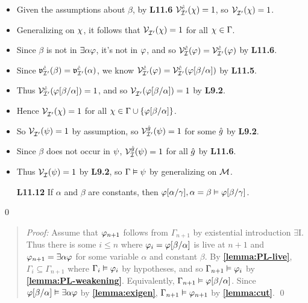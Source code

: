 \documentclass[a4paper, 11pt]{article} %
\begin{document}
\begin{itemize}
    \item Given the assumptions about $\beta$, by \textbf{L11.6} $\mathcal{V}_{\mathcal{I}'}^{\hat{e}}(\chi) = 1$, so $\mathcal{V}_{\mathcal{I}'}^{}(\chi) = 1$.
    \item Generalizing on $\chi$, it follows that $\mathcal{V}_{\mathcal{I}'}^{}(\chi) = 1$ for all $\chi \in \Gamma$.
    \item Since $\beta$ is not in $\exists \alpha\varphi$, it's not in $\varphi$, and so $\mathcal{V}_{\mathcal{I}}^{\hat{c}}(\varphi)=\mathcal{V}_{\mathcal{I}'}^{\hat{c}}(\varphi)$ by \textbf{L11.6}.
    \item Since $\mathfrak{v}_{\mathcal{I}'}^{\hat{c}}(\beta)=\mathfrak{v}_{\mathcal{I}'}^{\hat{c}}(\alpha)$, we know $\mathcal{V}_{\mathcal{I}'}^{\hat{c}}(\varphi)=\mathcal{V}_{\mathcal{I}'}^{\hat{c}}(\varphi[\beta/\alpha])$ by \textbf{L11.5}. 
    \item Thus $\mathcal{V}_{\mathcal{I}'}^{\hat{c}}(\varphi[\beta/\alpha])=1$, and so $\mathcal{V}_{\mathcal{I}'}^{}(\varphi[\beta/\alpha])=1$ by \textbf{L9.2}.
    \item Hence $\mathcal{V}_{\mathcal{I}'}^{}(\chi) = 1$ for all $\chi \in \Gamma \cup \lbrace\varphi[\beta/\alpha]\rbrace$.
    \item So $\mathcal{V}_{\mathcal{I}'}^{}(\psi) = 1$ by assumption, so $\mathcal{V}_{\mathcal{I}'}^{\hat{g}}(\psi)=1$ for some $\hat{g}$ by \textbf{L9.2}.
    \item Since $\beta$ does not occur in $\psi$, $\mathcal{V}_{\mathcal{I}}^{\hat{g}}(\psi)=1$ for all $\hat{g}$ by \textbf{L11.6}.
    \item Thus $\mathcal{V}_{\mathcal{I}}^{}(\psi)=1$ by \textbf{L9.2}, so $\Gamma \vDash \psi$ by generalizing on $\mathcal{M}$.
    
  \item[\bf L11.12] If $\alpha$ and $\beta$ are constants, then $\varphi[\alpha/\gamma], \alpha = \beta \vDash \varphi[\beta/\gamma]$.
\end{itemize}


  



  \qed


\begin{quote} 
  \textit{Proof:} Assume that $\varphi_{n+1}$ follows from $\Gamma_{n+1}$ by existential introduction $\exists$I.
  Thus there is some $i\leq n$ where $\varphi_i=\varphi[\beta/\alpha]$ is live at $n+1$ and $\varphi_{n+1}=\exists \alpha\varphi$ for some variable $\alpha$ and constant $\beta$.
  By \textbf{\ref{lemma:PL-live}}, $\Gamma_i\subseteq \Gamma_{n+1}$ where $\Gamma_i\vDash\varphi_i$ by hypotheses, and so $\Gamma_{n+1} \vDash \varphi_i$ by \textbf{\ref{lemma:PL-weakening}}.
  Equivalently, $\Gamma_{n+1} \vDash \varphi[\beta/\alpha]$.
  Since $\varphi[\beta/\alpha] \vDash \exists \alpha\varphi$ by \textbf{\ref{lemma:exigen}}, $\Gamma_{n+1}\vDash\varphi_{n+1}$ by \textbf{\ref{lemma:cut}}.
  \qed
\end{quote}
\end{document}
